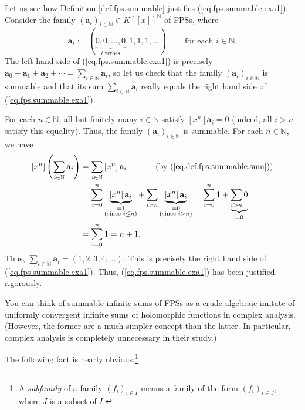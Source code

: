 \begin{example}
Let us see how Definition \ref{def.fps.summable} justifies
(\ref{eq.fps.summable.exa1}). Consider the family $\left(  \mathbf{a}%
_{i}\right)  _{i\in\mathbb{N}}\in K\left[  \left[  x\right]  \right]
^{\mathbb{N}}$ of FPSs, where%
\[
\mathbf{a}_{i}:=\left(  \underbrace{0,0,\ldots,0}_{i\text{ zeroes}%
},1,1,1,\ldots\right)  \ \ \ \ \ \ \ \ \ \ \text{for each }i\in\mathbb{N}.
\]
The left hand side of (\ref{eq.fps.summable.exa1}) is precisely $\mathbf{a}%
_{0}+\mathbf{a}_{1}+\mathbf{a}_{2}+\cdots=\sum_{i\in\mathbb{N}}\mathbf{a}_{i}%
$, so let us check that the family $\left(  \mathbf{a}_{i}\right)
_{i\in\mathbb{N}}$ is summable and that its sum $\sum_{i\in\mathbb{N}%
}\mathbf{a}_{i}$ really equals the right hand side of
(\ref{eq.fps.summable.exa1}).

For each $n\in\mathbb{N}$, all but finitely many $i\in\mathbb{N}$ satisfy
$\left[  x^{n}\right]  \mathbf{a}_{i}=0$ (indeed, all $i>n$ satisfy this
equality). Thus, the family $\left(  \mathbf{a}_{i}\right)  _{i\in\mathbb{N}}$
is summable. For each $n\in\mathbb{N}$, we have%
\begin{align*}
\left[  x^{n}\right]  \left(  \sum_{i\in\mathbb{N}}\mathbf{a}_{i}\right)   &
=\sum_{i\in\mathbb{N}}\left[  x^{n}\right]  \mathbf{a}_{i}%
\ \ \ \ \ \ \ \ \ \ \left(  \text{by (\ref{eq.def.fps.summable.sum})}\right)
\\
&  =\sum_{i=0}^{n}\underbrace{\left[  x^{n}\right]  \mathbf{a}_{i}%
}_{\substack{=1\\\text{(since }i\leq n\text{)}}}+\sum_{i>n}\underbrace{\left[
x^{n}\right]  \mathbf{a}_{i}}_{\substack{=0\\\text{(since }i>n\text{)}}%
}=\sum_{i=0}^{n}1+\underbrace{\sum_{i>n}0}_{=0}\\
&  =\sum_{i=0}^{n}1=n+1.
\end{align*}
Thus, $\sum_{i\in\mathbb{N}}\mathbf{a}_{i}=\left(  1,2,3,4,\ldots\right)  $.
This is precisely the right hand side of (\ref{eq.fps.summable.exa1}). Thus,
(\ref{eq.fps.summable.exa1}) has been justified rigorously.
\end{example}

You can think of summable infinite sums of FPSs as a crude algebraic imitate
of uniformly convergent infinite sums of holomorphic functions in complex
analysis. (However, the former are a much simpler concept than the latter. In
particular, complex analysis is completely unnecessary in their study.)

The following fact is nearly obvious:\footnote{A \emph{subfamily} of a family
$\left(  f_{i}\right)  _{i\in I}$ means a family of the form $\left(
f_{i}\right)  _{i\in J}$, where $J$ is a subset of $I$.}

